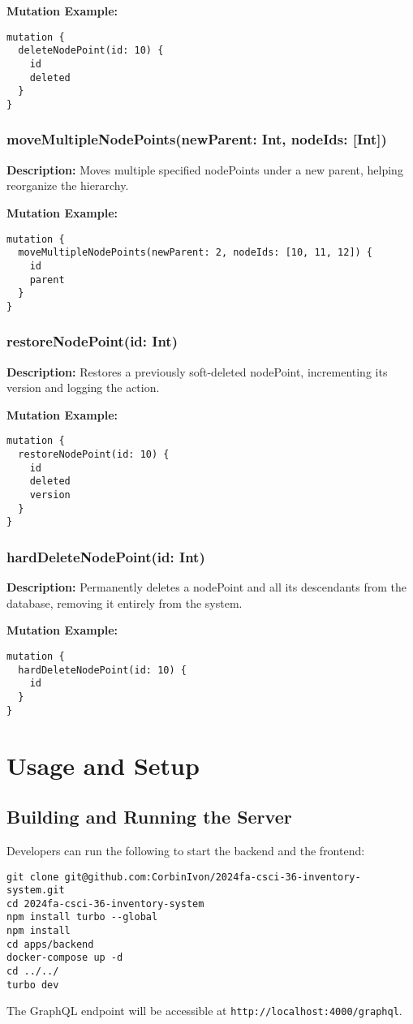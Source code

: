 \documentclass[12pt,a4paper]{article}
\begin{document}
\noindent \textbf{Mutation Example:}
\begin{verbatim}
mutation {
  deleteNodePoint(id: 10) {
    id
    deleted
  }
}
\end{verbatim}

\subsubsection{moveMultipleNodePoints(newParent: Int, nodeIds: [Int])}
\textbf{Description:}
Moves multiple specified nodePoints under a new parent, helping reorganize the hierarchy.

\noindent \textbf{Mutation Example:}
\begin{verbatim}
mutation {
  moveMultipleNodePoints(newParent: 2, nodeIds: [10, 11, 12]) {
    id
    parent
  }
}
\end{verbatim}

\subsubsection{restoreNodePoint(id: Int)}
\textbf{Description:}
Restores a previously soft-deleted nodePoint, incrementing its version and logging the action.

\noindent \textbf{Mutation Example:}
\begin{verbatim}
mutation {
  restoreNodePoint(id: 10) {
    id
    deleted
    version
  }
}
\end{verbatim}

\subsubsection{hardDeleteNodePoint(id: Int)}
\textbf{Description:}
Permanently deletes a nodePoint and all its descendants from the database, removing it entirely from the system.

\noindent \textbf{Mutation Example:}
\begin{verbatim}
mutation {
  hardDeleteNodePoint(id: 10) {
    id
  }
}
\end{verbatim}

\section{Usage and Setup}
\subsection{Building and Running the Server}
Developers can run the following to start the backend and the frontend:
\begin{verbatim}
git clone git@github.com:CorbinIvon/2024fa-csci-36-inventory-system.git
cd 2024fa-csci-36-inventory-system
npm install turbo --global
npm install
cd apps/backend
docker-compose up -d
cd ../../
turbo dev
\end{verbatim}
The GraphQL endpoint will be accessible at \texttt{http://localhost:4000/graphql}.
\end{document}
